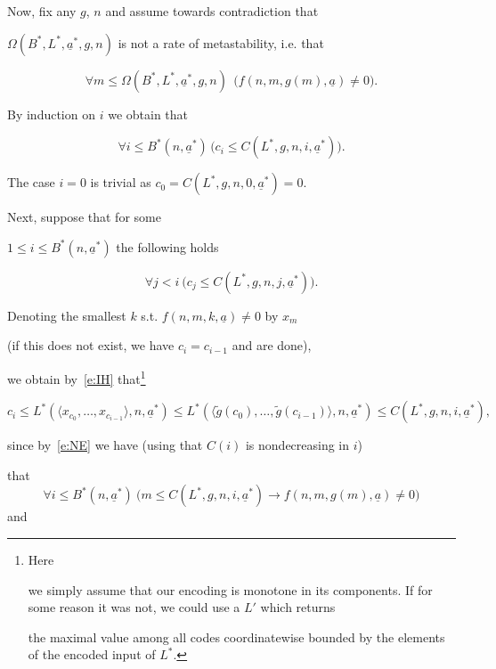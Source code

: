 \documentclass[1p]{elsarticle}
\newcommand{\be}[1][{e:\arabic{equation}}] { \begin{equation}\label{#1} }
\newcommand{\ee} { \end{equation} }
\theoremstyle{plain}
\theoremstyle{definition}
\theoremstyle{remark}
\renewenvironment{proof}[1][]{\noindent{\bf Proof{#1}. }}{\nopagebreak[4]{\hspace*{\fill}


  $\Box$              %

 }{\vspace{2ex}}}
\theoremstyle{definition}
\begin{document}
{\begin{proof}
Now, fix any $g$, $n$ and assume towards contradiction that 

$\Omega(B^*,L^*,\underline{a}^*,g,n)$ is not a rate of metastability, i.e. that

\be[e:NE] 

\forall m\leq \Omega(B^*,L^*,\underline{a}^*,g,n)  \ \ \big( f(n,m,g(m),\underline{a})\neq0 \big).

\ee

By induction on $i$ we obtain that

\be[e:IC] 

\forall i\leq B^*(n,\underline{a}^*) \,\big(c_i\leq 

C(L^*,g,n,i,\underline{a}^*)

\big).

\ee

The case $i=0$ is trivial as $c_0=C(L^*,g,n,0,\underline{a}^*)=0$. 

Next, suppose that for some 

$1\leq i\leq B^*(n,\underline{a}^*)$ the following holds

\be[e:IH] 

\forall j<i\ \big(c_j\leq C(L^*,g,n,j,\underline{a}^*)\big). 

\ee

Denoting the smallest $k$ s.t. $f(n,m,k,\underline{a})\neq0$ by $x_m$ 

(if this does not exist, we have $c_i=c_{i-1}$ and are done), 

we obtain by~\eqref{e:IH} that\footnote{Here

we simply assume that our encoding is monotone in its components. If for some reason it was not, we could use a $L'$ which returns

the maximal value among all codes coordinatewise bounded by the elements of the encoded input of $L^*$.}

\[

   c_i\leq L^*(\langle x_{c_0},\ldots,x_{c_{i-1}}\rangle, n,\underline{a}^*)

   \leq L^*(\langle \tilde g({c_0}),\ldots,\tilde g({c_{i-1}})\rangle, n,\underline{a}^*)\le C(L^*,g,n,i,\underline{a}^*),

\]

since by~\eqref{e:NE} we have (using that $C(i)$ is nondecreasing in $i$) 

that \[ \forall i\leq B^*(n,\underline{a}^*)\ 

\big(m\leq C(L^*,g,n,i,\underline{a}^*)\rightarrow f(n,m,g(m),\underline{a})\neq0 \big)\] and 


\end{proof}}
\end{document}
